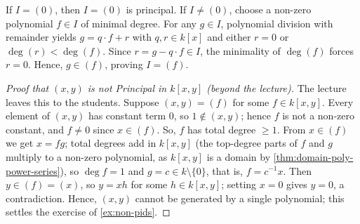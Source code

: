 \begin{content}

\begin{steps}
If $I = (0)$, then $I = (0)$ is principal. If $I \neq (0)$, choose a non-zero polynomial $f \in I$ of minimal degree. For any $g \in I$, polynomial division with remainder yields $g = q \cdot f + r$ with $q, r \in k[x]$ and either $r = 0$ or $\deg(r) < \deg(f)$. Since $r = g - q \cdot f \in I$, the minimality of $\deg(f)$ forces $r = 0$. Hence, $g \in (f)$, proving $I = (f)$.
\end{steps}



\begin{proof}[{Proof that $(x, y)$ is not Principal in $k[x, y]$} (beyond the lecture)]
The lecture leaves this to the students. Suppose $(x, y) = (f)$ for some $f \in k[x, y]$. Every element of $(x, y)$ has constant term $0$, so $1 \notin (x, y)$; hence $f$ is not a non-zero constant, and $f \neq 0$ since $x \in (f)$. So, $f$ has total degree $\ge 1$. From $x \in (f)$ we get $x = f g$; total degrees add in $k[x, y]$ (the top-degree parts of $f$ and $g$ multiply to a non-zero polynomial, as $k[x, y]$ is a domain by \cref{thm:domain-poly-power-series}), so $\deg f = 1$ and $g = c \in k \setminus \{0\}$, that is, $f = c^{-1} x$. Then $y \in (f) = (x)$, so $y = x h$ for some $h \in k[x, y]$; setting $x = 0$ gives $y = 0$, a contradiction. Hence, $(x, y)$ cannot be generated by a single polynomial; this settles the exercise of \cref{ex:non-pids}.
\end{proof}
\end{content}

